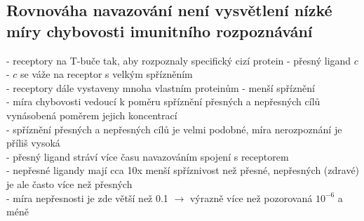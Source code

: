 \documentclass[11pt,a4paper]{report}
\begin{document}
\subsection{Rovnováha navazování není vysvětlení nízké míry chybovosti imunitního rozpoznávání}
- receptory na T-buče tak, aby rozpoznaly specifický cizí protein - přesný ligand $c$\\
- $c$ se váže na receptor s velkým spřízněním\\
\indent - receptory dále vystaveny mnoha vlastním proteinům - menší spříznění\\
- míra chybovosti vedoucí k poměru spříznění přesných a nepřesných cílů vynásobená poměrem jejich koncentrací\\
- spříznění přesných a nepřesných cílů je velmi podobné, míra nerozpoznání je příliš vysoká\\
- přesný ligand stráví více času navazováním spojení s receptorem\\
- nepřesné ligandy mají cca 10x menší spříznivost než přesné, nepřesných (zdravé) je ale často více než přesných\\
- míra nepřesnosti je zde větší než 0.1 $\rightarrow$ výrazně více než pozorovaná $10^{-6}$ a méně\\
\end{document}
